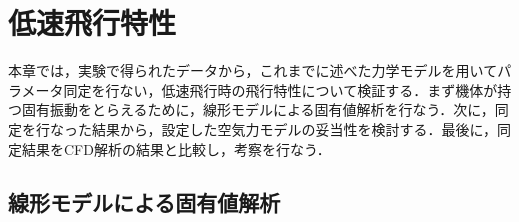 
\chapter{低速飛行特性}
\label{flight_char}

本章では，実験で得られたデータから，これまでに述べた力学モデルを用いてパラメータ同定を行ない，低速飛行時の飛行特性について検証する．まず機体が持つ固有振動をとらえるために，線形モデルによる固有値解析を行なう．次に，同定を行なった結果から，設定した空気力モデルの妥当性を検討する．最後に，同定結果をCFD解析の結果と比較し，考察を行なう．

\section{線形モデルによる固有値解析}
\label{sec:analyze}

